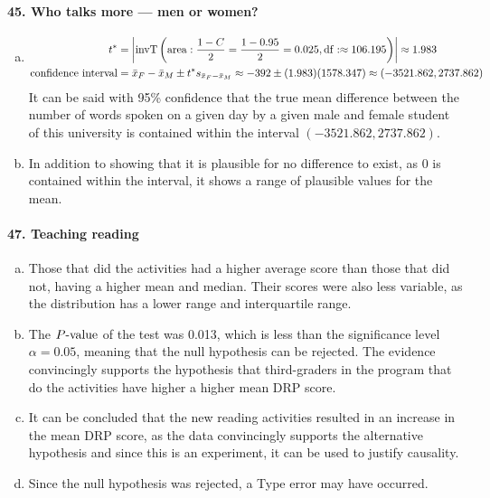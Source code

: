 \documentclass[../Homework]{subfiles}
\begin{document}
		\paragraph{45. Who talks more --- men or women?}
			\begin{enumerate}[a.]
				\item
					\begin{align*}
						t^* &= \left|\operatorname{invT}\left(\operatorname{area}: \frac{1 - C}{2} = \frac{1 - 0.95}{2} = 0.025, \operatorname{df}: \approx 106.195\right)\right| \approx 1.983 \\
						\text{confidence interval} &= \bar{x}_F - \bar{x}_M \pm t^*s_{\bar{x}_F - \bar{x}_M} \approx -392 \pm (1.983)(1578.347) \approx (-3521.862, 2737.862)
					\end{align*}
					It can be said with 95\% confidence that the true mean difference between the number of words spoken on a given day by a given male and female student of this university is contained within the interval $(-3521.862, 2737.862)$.
				\item
					In addition to showing that it is plausible for no difference to exist, as 0 is contained within the interval, it shows a range of plausible values for the mean.
			\end{enumerate}
		\paragraph{47. Teaching reading}
			\begin{enumerate}[a.]
				\item
					Those that did the activities had a higher average score than those that did not, having a higher mean and median. Their scores were also less variable, as the distribution has a lower range and interquartile range.
				\item
					The $P\text{-value}$ of the test was 0.013, which is less than the significance level $\alpha = 0.05$, meaning that the null hypothesis can be rejected. The evidence convincingly supports the hypothesis that third-graders in the program that do the activities have higher a higher mean DRP score.
				\item
					It can be concluded that the new reading activities resulted in an increase in the mean DRP score, as the data convincingly supports the alternative hypothesis and since this is an experiment, it can be used to justify causality.
				\item
					Since the null hypothesis was rejected, a Type  error may have occurred.
			\end{enumerate}
\end{document}
